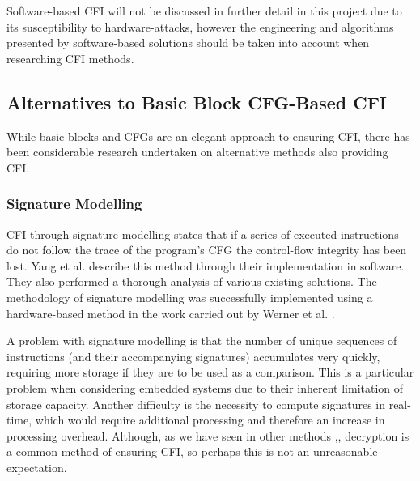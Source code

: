 Software-based CFI will not be discussed in further detail in this project due to its susceptibility to hardware-attacks, however the engineering and algorithms presented by software-based solutions should be taken into account when researching CFI methods.

\subsection{Alternatives to Basic Block CFG-Based CFI}

While basic blocks and CFGs are an elegant approach to ensuring CFI, there has been considerable research undertaken on alternative methods also providing CFI.

\subsubsection*{Signature Modelling}
CFI through signature modelling states that if a series of executed instructions do not follow the trace of the program's CFG the control-flow integrity has been lost. Yang et al. \cite{Yang2013} describe this method through their implementation in software. They also performed a thorough analysis of various existing solutions. The methodology of signature modelling was successfully implemented using a hardware-based method in the work carried out by Werner et al. \cite{Werner2016}.

A problem with signature modelling is that the number of unique sequences of instructions (and their accompanying signatures) accumulates very quickly, requiring more storage if they are to be used as a comparison. This is a particular problem when considering embedded systems due to their inherent limitation of storage capacity. Another difficulty is the necessity to compute signatures in real-time, which would require additional processing and therefore an increase in processing overhead. Although, as we have seen in other methods \cite{Davi2015},\cite{Lee2019}, decryption is a common method of ensuring CFI, so perhaps this is not an unreasonable expectation.


